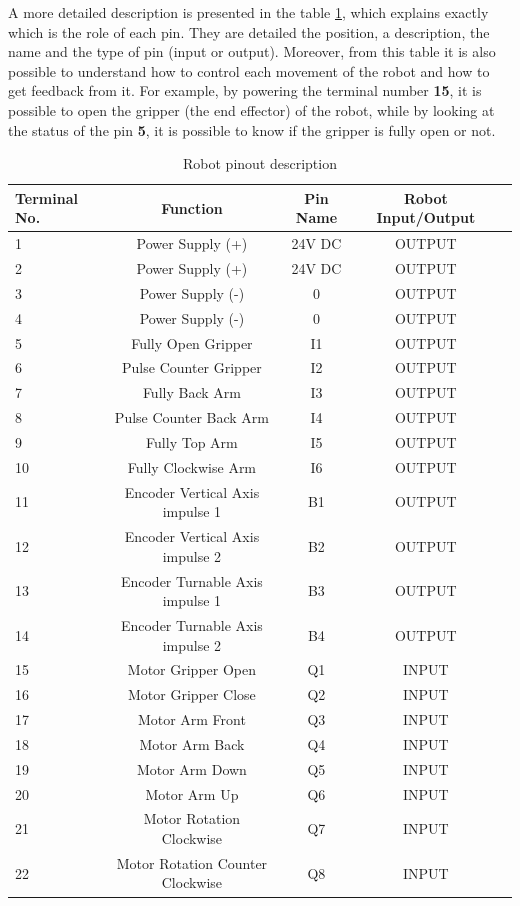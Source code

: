 A more detailed description is presented in the table \ref{tab:robot_pinout_description}, which explains exactly which is the role of each pin. They are detailed the position, a description, the name and the type of pin (input or output).
Moreover, from this table it is also possible to understand how to control each movement of the robot and how to get feedback from it. For example, by powering the terminal number \textbf{15}, it is possible to open the gripper (the end effector) of the robot, while by looking at the status of the pin \textbf{5}, it is possible to know if the gripper is fully open or not.

\begin{table}[!htp]\centering
\caption{Robot pinout description}\label{tab:robot_pinout_description}
\scriptsize
{}
\begin{tabular}{lcccc}\toprule
Terminal No. &Function &Pin Name &Robot Input/Output \\\midrule
1 &Power Supply (+) &24V DC &OUTPUT \\
2 &Power Supply (+) &24V DC &OUTPUT \\
3 &Power Supply (-) &0 &OUTPUT \\
4 &Power Supply (-) &0 &OUTPUT \\
5 &Fully Open Gripper &I1 &OUTPUT \\
6 &Pulse Counter Gripper &I2 &OUTPUT \\
7 &Fully Back Arm &I3 &OUTPUT \\
8 &Pulse Counter Back Arm &I4 &OUTPUT \\
9 &Fully Top Arm &I5 &OUTPUT \\
10 &Fully Clockwise Arm &I6 &OUTPUT \\
11 &Encoder Vertical Axis impulse 1 &B1 &OUTPUT \\
12 &Encoder Vertical Axis impulse 2 &B2 &OUTPUT \\
13 &Encoder Turnable Axis impulse 1 &B3 &OUTPUT \\
14 &Encoder Turnable Axis impulse 2 &B4 &OUTPUT \\
15 &Motor Gripper Open &Q1 &INPUT \\
16 &Motor Gripper Close &Q2 &INPUT \\
17 &Motor Arm Front &Q3 &INPUT \\
18 &Motor Arm Back &Q4 &INPUT \\
19 &Motor Arm Down &Q5 &INPUT \\
20 &Motor Arm Up &Q6 &INPUT \\
21 &Motor Rotation Clockwise &Q7 &INPUT \\
22 &Motor Rotation Counter Clockwise &Q8 &INPUT \\
\bottomrule
\end{tabular}
\end{table}

